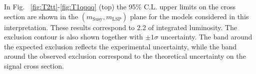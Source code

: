 
In Fig. ~\ref{fig:T2tt}-\ref{fig:T1qqqq} (top) the 95\% C.L. upper limits on the cross section are shown 
in the $(m_{\mathrm{Susy}},m_{\mathrm{LSP}})$ plane for the models considered in this interpretation. 
These results correspond to 2.2 \ifb of integrated luminosity. 
The exclusion contour is also shown together with $\pm1\sigma$ uncertainty. 
The band around the expected exclusion reflects the experimental uncertainty, 
while the band around the observed exclusion correspond to the theoretical 
uncertainty on the signal cross section.\\


